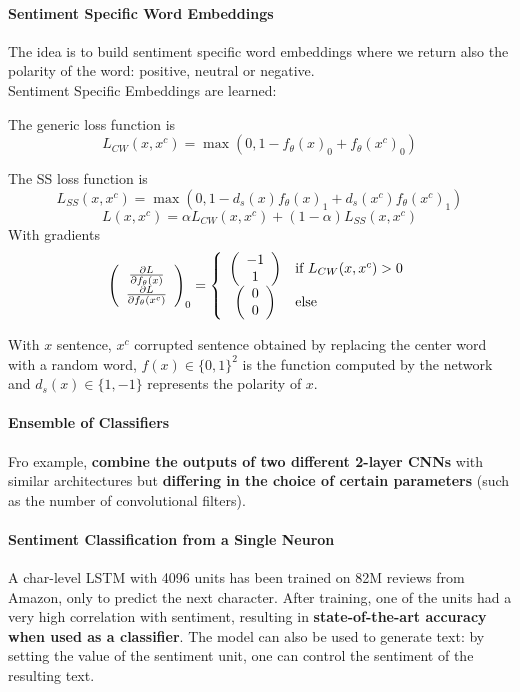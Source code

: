 \documentclass[10pt]{report}
\begin{document}
\paragraph{Sentiment Specific Word Embeddings} The idea is to build sentiment specific word embeddings where we return also the polarity of the word: positive, neutral or negative.\\
Sentiment Specific Embeddings are learned:
\begin{list}{}{}
	\item The generic loss function is $$L_{CW}(x, x^c) = \max(0, 1-f_\theta(x)_0 + f_\theta(x^c)_0)$$
	\item The SS loss function is
	$$L_{SS}(x, x^c) = \max(0, 1 - d_s(x)f_\theta(x)_1 + d_s(x^c)f_\theta(x^c)_1)$$
	$$L(x,x^c) = \alpha L_{CW}(x,x^c)+(1-\alpha)L_{SS}(x,x^c)$$
	With gradients
	$$\left(\begin{array}{c}
	\frac{\partial L}{\partial f_\theta(x)}\\
	\frac{\partial L}{\partial f_\theta(x^c)}
	\end{array}\right)_0 = \left\{\begin{array}{cl}
	\left(\begin{array}{c}
	-1\\1
	\end{array}\right)&\hbox{if }L_{CW}(x, x^c) > 0\\
	\left(\begin{array}{c}
	0\\0
	\end{array}\right)&\hbox{else}\\
	\end{array}\right.$$
\end{list}
With $x$ sentence, $x^c$ corrupted sentence obtained by replacing the center word with a random word, $f(x)\in \{0,1\}^2$ is the function computed by the network and $d_s(x)\in\{1,-1\}$ represents the polarity of $x$.
\paragraph{Ensemble of Classifiers} Fro example, \textbf{combine the outputs of two different 2-layer CNNs} with similar architectures but \textbf{differing in the choice of certain parameters} (such as the number of convolutional filters).
\paragraph{Sentiment Classification from a Single Neuron} A char-level LSTM with 4096 units has been trained on 82M reviews from Amazon, only to predict the next character. After training, one of the units had a very high correlation with sentiment, resulting in \textbf{state-of-the-art accuracy when used as a classifier}. The model can also be used to generate text: by setting the value of the sentiment unit, one can control the sentiment of the resulting text.
\end{document}
